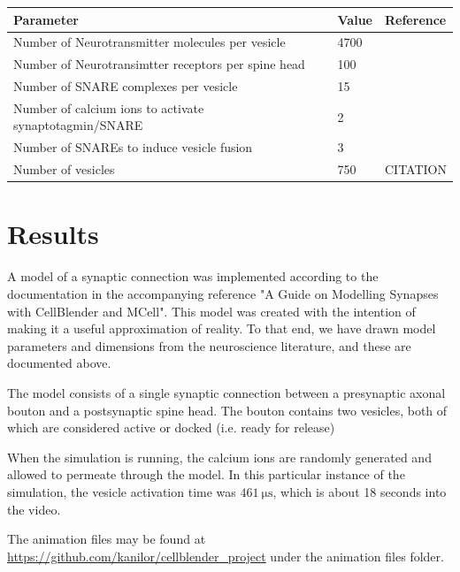 \documentclass[a4paper]{article}
\begin{document}
\begin{table}[H]
\begin{tabular}{lll}
Parameter & Value & Reference \\ \hline
Number of Neurotransmitter molecules per vesicle & 4700&\cite{Bruns:Nature:1995} \\
Number of Neurotransimtter receptors per spine head & 100 & \cite{Stricker:JPhysiol:1996} \\
Number of SNARE complexes per vesicle & 15 & \cite{Wilhelm:Science:2014} \\ 
Number of calcium ions to activate synaptotagmin/SNARE & 2 & \cite{Dittrich:BiophysJ:2013} \\
Number of SNAREs to induce vesicle fusion & 3 & \cite{Dittrich:BiophysJ:2013} \\  
Number of vesicles & 750 & CITATION\\
\end{tabular}
\end{table}

\section{Results}
A model of a synaptic connection was implemented according to the documentation in the accompanying reference "A Guide on Modelling Synapses with CellBlender and MCell". This model was created with the intention of making it a useful approximation of reality. To that end, we have drawn model parameters and dimensions from the neuroscience literature, and these are documented above.

The model consists of a single synaptic connection between a presynaptic axonal bouton and a postsynaptic spine head. The bouton contains two vesicles, both of which are considered active or docked (i.e. ready for release)

When the simulation is running, the calcium ions are randomly generated and allowed to permeate through the model. In this particular instance of the simulation, the vesicle activation time was $\SI{461}{\micro\second}$, which is about 18 seconds into the video.

The animation files may be found at \url{https://github.com/kanilor/cellblender_project} under the animation files folder.
\end{document}
